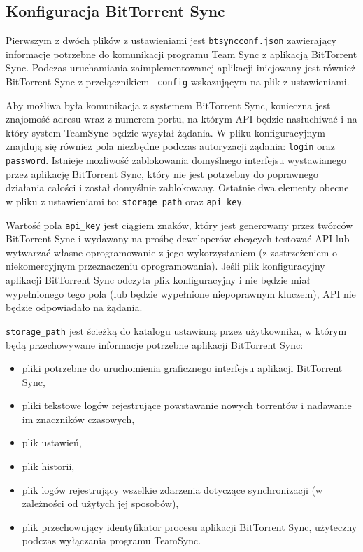 \subsection{Konfiguracja BitTorrent Sync}

\label{configbtsync}

Pierwszym z dwóch plików z ustawieniami jest \texttt{btsyncconf.json} zawierający informacje potrzebne do komunikacji programu Team Sync z aplikacją BitTorrent Sync. Podczas uruchamiania zaimplementowanej aplikacji inicjowany jest również BitTorrent Sync z przełącznikiem \texttt{--config} wskazującym na plik z ustawieniami.

Aby możliwa była komunikacja z systemem BitTorrent Sync, konieczna jest znajomość adresu wraz z numerem portu, na którym API będzie nasłuchiwać i na który system TeamSync będzie wysyłał żądania. W pliku konfiguracyjnym znajdują się również pola niezbędne podczas autoryzacji żądania: \texttt{login} oraz \texttt{password}. Istnieje możliwość zablokowania domyślnego interfejsu wystawianego przez aplikację BitTorrent Sync, który nie jest potrzebny do poprawnego działania całości i został domyślnie zablokowany. Ostatnie dwa elementy obecne w pliku z ustawieniami to: \texttt{storage\_path} oraz \texttt{api\_key}.

Wartość pola \texttt{api\_key} jest ciągiem znaków, który jest generowany przez twórców BitTorrent Sync i wydawany na prośbę deweloperów chcących testować API lub wytwarzać własne oprogramowanie z jego wykorzystaniem (z zastrzeżeniem o niekomercyjnym przeznaczeniu oprogramowania). Jeśli plik konfiguracyjny aplikacji BitTorrent Sync odczyta plik konfiguracyjny i nie będzie miał wypełnionego tego pola (lub będzie wypełnione niepoprawnym kluczem), API nie będzie odpowiadało na żądania.

\texttt{storage\_path} jest ścieżką do katalogu ustawianą przez użytkownika, w którym będą przechowywane informacje potrzebne aplikacji BitTorrent Sync:

\begin{itemize}[noitemsep]
  \item pliki potrzebne do uruchomienia graficznego interfejsu aplikacji BitTorrent Sync,
  
  \item pliki tekstowe logów rejestrujące powstawanie nowych torrentów i nadawanie im znaczników czasowych,
  
  \item plik ustawień,
  
  \item plik historii,
  
  \item plik logów rejestrujący wszelkie zdarzenia dotyczące synchronizacji (w zależności od użytych jej sposobów),
  
  \item plik przechowujący identyfikator procesu aplikacji BitTorrent Sync, użyteczny podczas wyłączania programu TeamSync.
\end{itemize}

